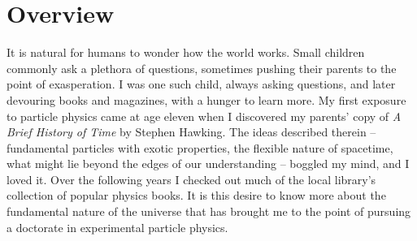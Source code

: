 \chapter{Overview}
\label{over}


It is natural for humans to wonder how the world works.  %
Small children commonly ask a plethora of questions, 
sometimes pushing their parents to the point of exasperation.  
I was one such child, always asking questions, and later %
devouring books and magazines, with a hunger to learn more.  
My first exposure to particle physics came at age eleven 
when I discovered my parents' copy of 
\textit{A Brief History of Time} by Stephen Hawking.  %
The ideas described therein -- fundamental particles 
with exotic properties, the flexible nature of spacetime, 
what might lie beyond the edges of our understanding -- 
boggled my mind, and I loved it.  
Over the following years I checked out much of the 
local library's collection of popular physics books.  
It is this desire to know more about the fundamental 
nature of the universe that has brought me to the point 
of pursuing a doctorate in experimental particle physics.  



